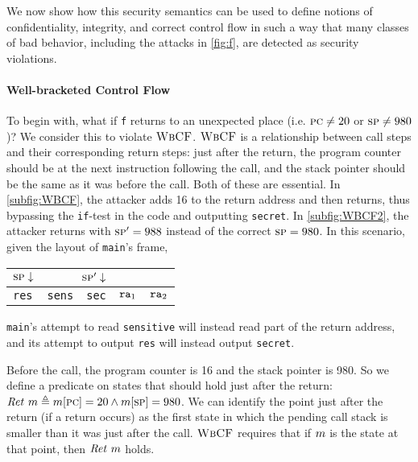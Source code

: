 \documentclass[10pt,conference]{ieeetran}%
\theoremstyle{definition}
\begin{document}
We now show how this security semantics can be used to define notions of confidentiality,
integrity, and correct control flow in such a way that many classes of
bad behavior, including the attacks in \cref{fig:f}, are
detected as security violations.

\paragraph*{Well-bracketed Control Flow}

To begin with, what if {\tt f} returns to an unexpected place (i.e. \(\PCname \neq 20\) or
\(\SP \neq 980\))? We consider this to violate \(\wbcf\). \(\wbcf\) is a relationship between
call steps and their corresponding return steps: just after the return, the program
counter should be at the next instruction following the call,
and the stack pointer should be the same as it was before the call.
Both of these are essential. In \cref{subfig:WBCF}, the attacker adds
16 to the return address and then returns, thus bypassing the {\tt if}-test in the code and outputting
{\tt secret}.
In \cref{subfig:WBCF2}, the attacker returns with \(\SP' = 988\) instead of the
correct \(\SP = 980\). In this scenario, given the layout of {\tt main}'s frame,
\begin{center}
\begin{tabular}{| l | l | l | l | l |}
  \multicolumn{1}{r}{\(\SP \downarrow\)} &
  \multicolumn{2}{r}{\(\SP' \downarrow\)} \\
  \hline
  {\tt res} & {\tt sens} & {\tt sec} & \(\mbox{\tt ra}_1\) & \(\mbox{\tt ra}_2\) \\
  \hline
\end{tabular}
\end{center}

\vspace{\abovedisplayskip}

\noindent
{\tt main}'s attempt to read {\tt sensitive} will instead
read part of the return address, and its attempt to output
{\tt res} will instead output {\tt secret}.

Before the call, the program counter is 16 and the stack pointer is 980.
So we define a predicate on states that should hold just after the return:
\(\ret\ \mach \triangleq \mach[\PCname] = 20 \wedge \mach[\SP] = 980\).
%
We can identify the point just after the return (if a return occurs)
as the first state in which the pending call stack is smaller than it was
just after the call.
\(\wbcf\) requires that if \(\mach\) is the state at that point, then \(\ret ~ \mach\) holds.
\end{document}
